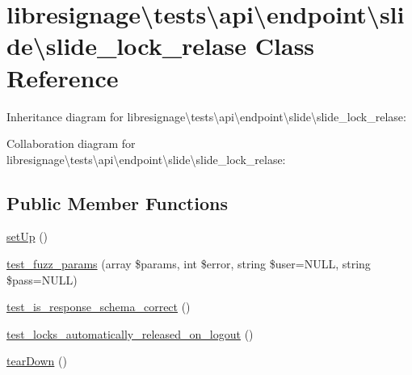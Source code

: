 \hypertarget{classlibresignage_1_1tests_1_1api_1_1endpoint_1_1slide_1_1slide__lock__relase}{}\section{libresignage\textbackslash{}tests\textbackslash{}api\textbackslash{}endpoint\textbackslash{}slide\textbackslash{}slide\+\_\+lock\+\_\+relase Class Reference}
\label{classlibresignage_1_1tests_1_1api_1_1endpoint_1_1slide_1_1slide__lock__relase}


Inheritance diagram for libresignage\textbackslash{}tests\textbackslash{}api\textbackslash{}endpoint\textbackslash{}slide\textbackslash{}slide\+\_\+lock\+\_\+relase\+:


Collaboration diagram for libresignage\textbackslash{}tests\textbackslash{}api\textbackslash{}endpoint\textbackslash{}slide\textbackslash{}slide\+\_\+lock\+\_\+relase\+:
\subsection*{Public Member Functions}
\begin{DoxyCompactItemize}
\item 
\hyperlink{classlibresignage_1_1tests_1_1api_1_1endpoint_1_1slide_1_1slide__lock__relase_ab7cfc00d2c3a6d7ff8b41dd77abd4839}{set\+Up} ()
\item 
\hyperlink{classlibresignage_1_1tests_1_1api_1_1endpoint_1_1slide_1_1slide__lock__relase_a0d45eee7c74a73ef65808430c2a9e4c7}{test\+\_\+fuzz\+\_\+params} (array \$params, int \$error, string \$user=N\+U\+LL, string \$pass=N\+U\+LL)
\item 
\hyperlink{classlibresignage_1_1tests_1_1api_1_1endpoint_1_1slide_1_1slide__lock__relase_aa05923d995aad7ed11bce238adcbec6a}{test\+\_\+is\+\_\+response\+\_\+schema\+\_\+correct} ()
\item 
\hyperlink{classlibresignage_1_1tests_1_1api_1_1endpoint_1_1slide_1_1slide__lock__relase_a0e111875c5de7579ad9c368a6de7953a}{test\+\_\+locks\+\_\+automatically\+\_\+released\+\_\+on\+\_\+logout} ()
\item 
\hyperlink{classlibresignage_1_1tests_1_1api_1_1endpoint_1_1slide_1_1slide__lock__relase_a85c99bfb37bf29ee6bfa37c089be03fe}{tear\+Down} ()
\end{DoxyCompactItemize}
